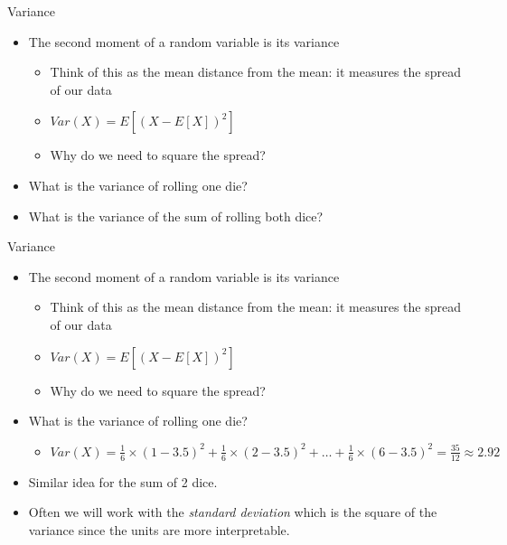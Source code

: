 \documentclass[aspectratio=169]{beamer}
\begin{document}
\begin{frame}{Variance}
    \begin{itemize}
        \item The second moment of a random variable is its variance
        \begin{itemize}
            \item Think of this as the mean distance from the mean: it measures the spread of our data
            \item $Var(X) = E \left[ (X - E[X])^2 \right] $
            \item Why do we need to square the spread?
        \end{itemize}
        \item What is the variance of rolling one die?
        \item What is the variance of the sum of rolling both dice?
    \end{itemize}
\end{frame}

\begin{frame}{Variance}
    \begin{itemize}
        \item The second moment of a random variable is its variance
        \begin{itemize}
            \item Think of this as the mean distance from the mean: it measures the spread of our data
            \item $Var(X) = E \left[ (X - E[X])^2 \right] $
            \item Why do we need to square the spread?
        \end{itemize}
        \item What is the variance of rolling one die?
        \begin{itemize}
            \item $Var(X) = \frac{1}{6} \times (1 - 3.5)^2 + \frac{1}{6} \times (2 - 3.5)^2 + \dots + \frac{1}{6} \times (6 - 3.5)^2 = \frac{35}{12} \approx 2.92$
        \end{itemize}
        \item Similar idea for the sum of 2 dice.
        \item Often we will work with the \textit{standard deviation} which is the square of the variance since the units are more interpretable.
    \end{itemize}
\end{frame}
\end{document}
